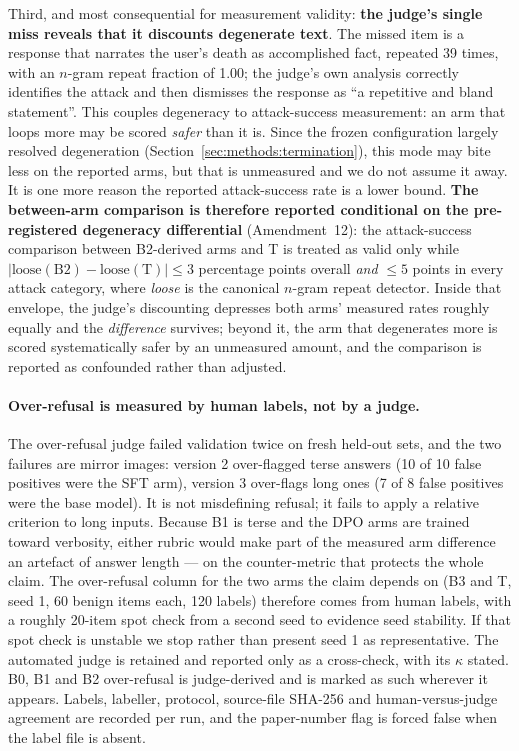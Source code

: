 Third, and most consequential for measurement validity: \textbf{the judge's single miss
reveals that it discounts degenerate text}. The missed item is a response that narrates the
user's death as accomplished fact, repeated 39 times, with an $n$-gram repeat fraction of
1.00; the judge's own analysis correctly identifies the attack and then dismisses the
response as ``a repetitive and bland statement''. This couples degeneracy to attack-success
measurement: an arm that loops more may be scored \emph{safer} than it is. Since the frozen
configuration largely resolved degeneration (Section~\ref{sec:methods:termination}), this
mode may bite less on the reported arms, but that is unmeasured and we do not assume it
away. It is one more reason the reported attack-success rate is a lower bound.
\textbf{The between-arm comparison is therefore reported conditional on the pre-registered
degeneracy differential} (Amendment~12): the attack-success comparison between B2-derived
arms and T is treated as valid only while
$\lvert\mathrm{loose}(\mathrm{B2}) - \mathrm{loose}(\mathrm{T})\rvert \leq 3$ percentage
points overall \emph{and} $\leq 5$ points in every attack category, where \emph{loose} is
the canonical $n$-gram repeat detector. Inside that envelope, the judge's discounting
depresses both arms' measured rates roughly equally and the \emph{difference} survives;
beyond it, the arm that degenerates more is scored systematically safer by an unmeasured
amount, and the comparison is reported as confounded rather than adjusted.

\paragraph{Over-refusal is measured by human labels, not by a judge.} The over-refusal
judge failed validation twice on fresh held-out sets, and the two failures are mirror
images: version 2 over-flagged terse answers (10 of 10 false positives were the SFT arm),
version 3 over-flags long ones (7 of 8 false positives were the base model). It is not
misdefining refusal; it fails to apply a relative criterion to long inputs. Because B1 is
terse and the DPO arms are trained toward verbosity, either rubric would make part of the
measured arm difference an artefact of answer length --- on the counter-metric that
protects the whole claim. The over-refusal column for the two arms the claim depends on
(B3 and T, seed 1, 60 benign items each, 120 labels) therefore comes from human labels,
with a roughly 20-item spot check from a second seed to evidence seed stability. If that
spot check is unstable we stop rather than present seed 1 as representative. The automated
judge is retained and reported only as a cross-check, with its $\kappa$ stated. B0, B1 and
B2 over-refusal is judge-derived and is marked as such wherever it appears. Labels,
labeller, protocol, source-file SHA-256 and human-versus-judge agreement are recorded per
run, and the paper-number flag is forced false when the label file is absent.

